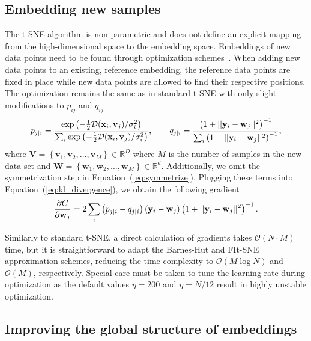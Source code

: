\documentclass[article]{jss}
\begin{document}
\subsection{Embedding new samples} \label{sec:meth.transform}

The t-SNE algorithm is non-parametric and does not define an explicit mapping from the
high-dimensional space to the embedding space. Embeddings of new data
points need to be found through optimization
schemes~\citep{policar2021embedding}. When adding new data points to an
existing, reference embedding, the reference data points are fixed in place
while new data points are allowed to find their respective positions. The
optimization remains the same as in standard t-SNE with only slight
modifications to $p_{ij}$ and $q_{ij}$
\begin{align}
p_{j \mid i} = \frac{\exp \left ( -\frac{1}{2} \mathcal{D}(\mathbf{x}_i, \mathbf{v}_j) /  \sigma_i^2 \right )}{\sum_{i} \exp \left ( -\frac{1}{2} \mathcal{D}(\mathbf{x}_i, \mathbf{v}_j) / \sigma_i^2 \right )}, \qquad
q_{j \mid i} = \frac{\left ( 1 + || \mathbf{y}_i - \mathbf{w}_j ||^2 \right )^{-1}}{\sum_{i}\left ( 1 + || \mathbf{y}_i - \mathbf{w}_j ||^2 \right )^{-1}}, \notag
\end{align}
\noindent where $\mathbf{V} = \left \{ \mathbf{v}_1, \mathbf{v}_2, \dots,
\mathbf{v}_M \right \} \in \mathbb{R}^D$ where $M$ is the number of samples in
the new data set and $\mathbf{W} = \left \{ \mathbf{w}_1, \mathbf{w}_2, \dots,
\mathbf{w}_M \right \} \in \mathbb{R}^d$. Additionally, we omit the
symmetrization step in Equation~(\ref{eq:symmetrize}). Plugging these terms into
Equation~(\ref{eq:kl_divergence}), we obtain the following gradient
\begin{equation}
\frac{\partial C}{\partial \mathbf{w}_j} = 2 \sum_i \left ( p_{j \mid i} - q_{j \mid i} \right ) \left ( \mathbf{y}_i - \mathbf{w}_j \right ) \left ( 1 + || \mathbf{y}_i - \mathbf{w}_j || ^2 \right )^{-1}. \notag
\label{eq:gradient}
\end{equation}

Similarly to standard t-SNE, a direct calculation of gradients takes
$\mathcal{O}(N \cdot M)$ time, but it is straightforward to adapt the Barnes-Hut
and FIt-SNE approximation schemes, reducing the time complexity to
$\mathcal{O}(M \log N)$ and $\mathcal{O}(M)$, respectively. Special care must be
taken to tune the learning rate during optimization as the default values
$\eta=200$ and $\eta=N/12$ result in highly unstable optimization.


\subsection{Improving the global structure of embeddings} \label{sec:meth.global}
\end{document}
